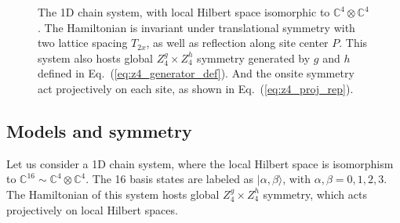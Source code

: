 \documentclass[reprint,amsmath,amssymb,aps,pra,]{revtex4-1}
\begin{document}
\begin{figure}[h]
  \centering
  \caption{The 1D chain system, with local Hilbert space isomorphic to $\mathbb{C}^4\otimes\mathbb{C}^4$.
  The Hamiltonian is invariant under translational symmetry with two lattice spacing $T_{2x}$, as well as reflection along site center $P$.
  This system also hosts global $Z_4^g\times Z_4^h$ symmetry generated by $g$ and $h$ defined in Eq.~(\ref{eq:z4_generator_def}).
  And the onsite symmetry act projectively on each site, as shown in Eq.~(\ref{eq:z4_proj_rep}).}
  \label{fig:1d_z4z4_spt}
\end{figure}

\subsection{Models and symmetry}
Let us consider a 1D chain system, where the local Hilbert space is isomorphism to $\mathbb{C}^{16}\sim\mathbb{C}^4\otimes\mathbb{C}^4$.
The 16 basis states are labeled as $|\alpha,\beta\rangle$, with $\alpha,\beta=0,1,2,3$.
The Hamiltonian of this system hosts global $Z_4^g\times Z_4^h$ symmetry, which acts projectively on local Hilbert spaces. 
\end{document}
